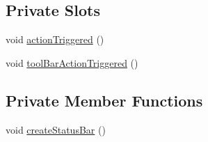 \subsection*{Private Slots}
\begin{DoxyCompactItemize}
\item 
void \hyperlink{classFglForm_a6a62cd6e46c191cbec6c49381fd53a95}{actionTriggered} ()
\item 
void \hyperlink{classFglForm_a7d6b1d8b49f56f8b8ae6dbffae4a6499}{toolBarActionTriggered} ()
\end{DoxyCompactItemize}
\subsection*{Private Member Functions}
\begin{DoxyCompactItemize}
\item 
void \hyperlink{classFglForm_a98a3ed85a0f12181c96d15a020250807}{createStatusBar} ()
\end{DoxyCompactItemize}
